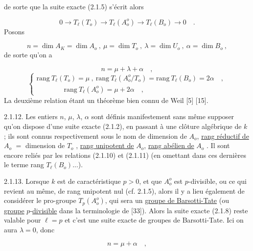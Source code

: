 
de sorte que la suite exacte (2.1.5) s'écrit alors

\begin{equation}\tag{2.1.8}
0 \longrightarrow T_\ell(T_o) \longrightarrow T_\ell(A_o^o) \longrightarrow T_\ell(B_o) \longrightarrow 0 \quad .
\end{equation}
Posons

\begin{equation}\tag{2.1.9}
n = \dim A_K = \dim A_o \ , \ \mu = \dim T_o \ , \ \lambda = \dim U_o \ , \ \alpha = \dim B_o \ ,
\end{equation}
de sorte qu'on a

\begin{equation}\tag{2.1.10}
n = \mu + \lambda + \alpha \quad ,
\end{equation}
\begin{equation}\tag{2.1.11}
\left\{
\begin{array}{l}
\mathrm{rang}\ T_\ell(T_o) = \mu \ , \ \mathrm{rang}\ T_\ell(A_o^o/T_o) = \mathrm{rang}\ T_\ell(B_o) = 2\alpha \quad , \\[1ex]
\qquad\qquad \mathrm{rang}\ T_\ell(A_o^o) = \mu + 2\alpha \quad ,
\end{array}
\right.
\end{equation}
La deuxième relation étant un théorème bien connu de Weil [5] [15].

2.1.12. Les entiers $n$, $\mu$, $\lambda$, $\alpha$ sont définis manifestement sans même supposer qu'on dispose d'une suite exacte (2.1.2), en passant à une clôture algébrique de $k$ ; ils sont connus respectivement sous le nom de dimension de $A_o$, \underline{rang réductif de} $A_o$ $=$ dimension de $T_o$ , \underline{rang unipotent de} $A_o$, \underline{rang abélien de} $A_o$ . Il sont encore reliés par les relations (2.1.10) et (2.1.11) (en omettant dans ces dernières le terme rang $T_\ell(B_o)$...).

2.1.13. Lorsque $k$ est de caractéristique $p > 0$, et que $A_o^o$ est $p$-divisible, ou ce qui revient au même, de rang unipotent nul (cf. 2.1.5), alors il y a lieu également de considérer le pro-groupe $T_p(A_o^o)$, qui sera un \underline{groupe de Barsotti-Tate} (ou \underline{groupe} $p$-\underline{divisible} dans la terminologie de [33]). Alors la suite exacte (2.1.8) reste valable pour $\ell = p$ et c'est une suite exacte de groupes de Barsotti-Tate. Ici on aura $\lambda = 0$, donc

\begin{equation}\tag{2.1.13.1}
n = \mu + \alpha \quad ,
\end{equation}

